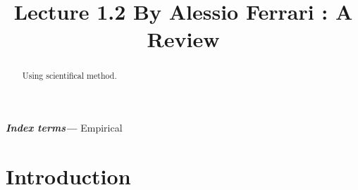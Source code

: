 \documentclass[conference, compsoc, twoside]{IEEEtran}
\begin{document}
\preto\tabular{\setcounter{magicrownumbers}{0}}
\newcommand\rownumber{\stepcounter{magicrownumbers}\arabic{magicrownumbers}}
\title{\Huge Lecture 1.2 By Alessio Ferrari : A Review}
\author{
}

\maketitle
\providecommand{\keywords}[1]{\textbf{\textit{Index terms---}} #1}
\begin{abstract}
Using scientifical method.
\end{abstract}

\keywords{Empirical}
\IEEEpeerreviewmaketitle

\section{Introduction}


\end{document}
